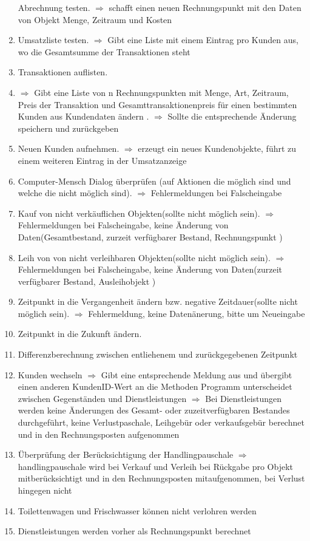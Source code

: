 \documentclass[a4paper,12pt,titlepage]{article}
\begin{document}
\begin{enumerate}
Abrechnung testen.
$\Rightarrow$ schafft einen neuen Rechnungspunkt mit den Daten von Objekt Menge, Zeitraum und Kosten
\item
Umsatzliste testen.
$\Rightarrow$ Gibt eine Liste mit einem Eintrag pro Kunden aus, wo die Gesamtsumme der Transaktionen steht
\item
Transaktionen auflisten.
\item
$\Rightarrow$ Gibt eine Liste von n Rechnungspunkten mit Menge, Art, Zeitraum, Preis der Transaktion und Gesamttransaktionenpreis für einen bestimmten Kunden aus
Kundendaten ändern .
$\Rightarrow$ Sollte die entsprechende Änderung speichern und zurückgeben
\item
Neuen Kunden aufnehmen.
$\Rightarrow$ erzeugt ein neues Kundenobjekte, führt zu einem weiteren Eintrag in der Umsatzanzeige
\item
Computer-Mensch Dialog überprüfen (auf Aktionen die möglich sind und welche die nicht möglich sind).
$\Rightarrow$ Fehlermeldungen bei Falscheingabe
\item
Kauf von nicht verkäuflichen Objekten(sollte nicht möglich sein).
$\Rightarrow$ Fehlermeldungen bei Falscheingabe, keine Änderung von Daten(Gesamtbestand, zurzeit verfügbarer Bestand, Rechnungspunkt )
\item
Leih von von nicht verleihbaren Objekten(sollte nicht möglich sein).
$\Rightarrow$ Fehlermeldungen bei Falscheingabe, keine Änderung von Daten(zurzeit verfügbarer Bestand, Ausleihobjekt )
\item
Zeitpunkt in die Vergangenheit ändern bzw. negative Zeitdauer(sollte nicht möglich sein).
$\Rightarrow$ Fehlermeldung, keine Datenänerung, bitte um Neueingabe
\item
Zeitpunkt in die Zukunft ändern.
\item
Differenzberechnung zwischen entliehenem und zurückgegebenen Zeitpunkt
\item
Kunden wechseln
$\Rightarrow$ Gibt eine entsprechende Meldung aus und übergibt einen anderen KundenID-Wert an die Methoden
Programm unterscheidet zwischen Gegenständen und Dienstleistungen
$\Rightarrow$ Bei Dienstleistungen werden keine Änderungen des Gesamt- oder zuzeitverfügbaren Bestandes durchgeführt, keine Verlustpaschale, Leihgebür oder verkaufsgebür  berechnet und in den Rechnungsposten aufgenommen
\item Überprüfung der Berücksichtigung der Handlingpauschale
$\Rightarrow$ handlingpauschale wird bei Verkauf und Verleih bei Rückgabe pro Objekt mitberücksichtigt und in den Rechnungsposten mitaufgenommen, bei Verlust hingegen nicht
\item Toilettenwagen und Frischwasser können nicht verlohren werden
\item Dienstleistungen werden vorher als Rechnungspunkt berechnet
\end{enumerate}
\appendix
\newpage
\end{document}
